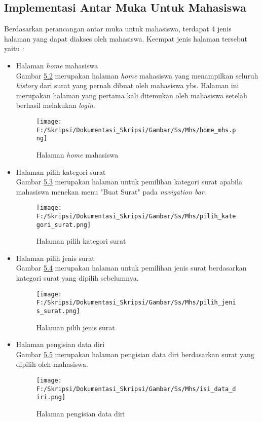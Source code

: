 \subsection{Implementasi Antar Muka Untuk Mahasiswa}
\label{sec:implementasi_antar_muka_mahasiswa}
Berdasarkan perancangan antar muka untuk mahasiswa, terdapat 4 jenis halaman yang dapat diakses oleh mahasiswa. Keempat jenis halaman tersebut yaitu :
\begin{itemize}
	\item Halaman \textit{home} mahasiswa\\
	 Gambar \hyperlink{halaman_home_mahasiswa}{5.2} merupakan halaman \textit{home} mahasiswa yang menampilkan seluruh \textit{history} dari surat yang pernah dibuat oleh mahasiswa ybs. Halaman ini merupakan halaman yang pertama kali ditemukan oleh mahasiswa setelah berhasil melakukan \textit{login}.
	 \begin{figure}[H]
	\centering
		\texttt{[image: F:/Skripsi/Dokumentasi\_Skripsi/Gambar/Ss/Mhs/home\_mhs.png]}
		\caption{Halaman \textit{home} mahasiswa}
		\label{fig:halaman_home_mahasiswa}
	\end{figure}
	
	\item Halaman pilih kategori surat\\
	Gambar \hyperlink{halaman_pilih_kategori_surat}{5.3} merupakan halaman untuk pemilihan kategori surat apabila mahasiswa menekan menu "Buat Surat" pada \textit{navigation bar}.
	\begin{figure}[H]
	\centering
		\texttt{[image: F:/Skripsi/Dokumentasi\_Skripsi/Gambar/Ss/Mhs/pilih\_kategori\_surat.png]}
		\caption{Halaman pilih kategori surat}
		\label{fig:halaman_pilih_kategori_surat}
	\end{figure}
	
	 \item Halaman pilih jenis surat\\
	Gambar \hyperlink{halaman_pilih_jenis_surat}{5.4} merupakan halaman untuk pemilihan jenis surat berdasarkan kategori surat yang dipilih sebelumnya.
	\begin{figure}[H]
	\centering
		\texttt{[image: F:/Skripsi/Dokumentasi\_Skripsi/Gambar/Ss/Mhs/pilih\_jenis\_surat.png]}
		\caption{Halaman pilih jenis surat}
		\label{fig:halaman_pilih_jenis_surat}
	\end{figure}
	
	\item Halaman pengisian data diri\\
	Gambar \hyperlink{halaman_pengisian_data_diri}{5.5} merupakan halaman pengisian data diri berdasarkan surat yang dipilih oleh mahasiswa.
	\begin{figure}[H]
	\centering
		\texttt{[image: F:/Skripsi/Dokumentasi\_Skripsi/Gambar/Ss/Mhs/isi\_data\_diri.png]}
		\caption{Halaman pengisian data diri}
		\label{fig:halaman_pengisian_data_diri}
	\end{figure}
	

\end{itemize}
